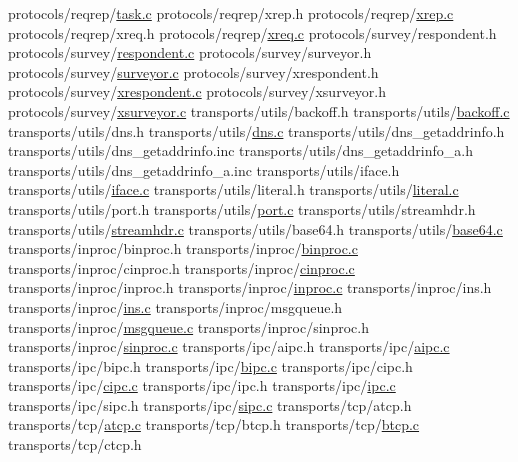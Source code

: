 \begin{DoxyCompactItemize}
protocols/reqrep/\hyperlink{all__1_8js_a7d4a455e4f44360eeccfbf0c3079fc32}{task.\+c} protocols/reqrep/xrep.\+h protocols/reqrep/\hyperlink{all__1_8js_a7d4a455e4f44360eeccfbf0c3079fc32}{xrep.\+c} protocols/reqrep/xreq.\+h protocols/reqrep/\hyperlink{all__1_8js_a7d4a455e4f44360eeccfbf0c3079fc32}{xreq.\+c} protocols/survey/respondent.\+h protocols/survey/\hyperlink{all__1_8js_a7d4a455e4f44360eeccfbf0c3079fc32}{respondent.\+c} protocols/survey/surveyor.\+h protocols/survey/\hyperlink{all__1_8js_a7d4a455e4f44360eeccfbf0c3079fc32}{surveyor.\+c} protocols/survey/xrespondent.\+h protocols/survey/\hyperlink{all__1_8js_a7d4a455e4f44360eeccfbf0c3079fc32}{xrespondent.\+c} protocols/survey/xsurveyor.\+h protocols/survey/\hyperlink{all__1_8js_a7d4a455e4f44360eeccfbf0c3079fc32}{xsurveyor.\+c} transports/utils/backoff.\+h transports/utils/\hyperlink{all__1_8js_a7d4a455e4f44360eeccfbf0c3079fc32}{backoff.\+c} transports/utils/dns.\+h transports/utils/\hyperlink{all__1_8js_a7d4a455e4f44360eeccfbf0c3079fc32}{dns.\+c} transports/utils/dns\+\_\+getaddrinfo.\+h transports/utils/dns\+\_\+getaddrinfo.\+inc transports/utils/dns\+\_\+getaddrinfo\+\_\+a.\+h transports/utils/dns\+\_\+getaddrinfo\+\_\+a.\+inc transports/utils/iface.\+h transports/utils/\hyperlink{all__1_8js_a7d4a455e4f44360eeccfbf0c3079fc32}{iface.\+c} transports/utils/literal.\+h transports/utils/\hyperlink{all__1_8js_a7d4a455e4f44360eeccfbf0c3079fc32}{literal.\+c} transports/utils/port.\+h transports/utils/\hyperlink{all__1_8js_a7d4a455e4f44360eeccfbf0c3079fc32}{port.\+c} transports/utils/streamhdr.\+h transports/utils/\hyperlink{all__1_8js_a7d4a455e4f44360eeccfbf0c3079fc32}{streamhdr.\+c} transports/utils/base64.\+h transports/utils/\hyperlink{all__1_8js_a7d4a455e4f44360eeccfbf0c3079fc32}{base64.\+c} transports/inproc/binproc.\+h transports/inproc/\hyperlink{all__1_8js_a7d4a455e4f44360eeccfbf0c3079fc32}{binproc.\+c} transports/inproc/cinproc.\+h transports/inproc/\hyperlink{all__1_8js_a7d4a455e4f44360eeccfbf0c3079fc32}{cinproc.\+c} transports/inproc/inproc.\+h transports/inproc/\hyperlink{all__1_8js_a7d4a455e4f44360eeccfbf0c3079fc32}{inproc.\+c} transports/inproc/ins.\+h transports/inproc/\hyperlink{all__1_8js_a7d4a455e4f44360eeccfbf0c3079fc32}{ins.\+c} transports/inproc/msgqueue.\+h transports/inproc/\hyperlink{all__1_8js_a7d4a455e4f44360eeccfbf0c3079fc32}{msgqueue.\+c} transports/inproc/sinproc.\+h transports/inproc/\hyperlink{all__1_8js_a7d4a455e4f44360eeccfbf0c3079fc32}{sinproc.\+c} transports/ipc/aipc.\+h transports/ipc/\hyperlink{all__1_8js_a7d4a455e4f44360eeccfbf0c3079fc32}{aipc.\+c} transports/ipc/bipc.\+h transports/ipc/\hyperlink{all__1_8js_a7d4a455e4f44360eeccfbf0c3079fc32}{bipc.\+c} transports/ipc/cipc.\+h transports/ipc/\hyperlink{all__1_8js_a7d4a455e4f44360eeccfbf0c3079fc32}{cipc.\+c} transports/ipc/ipc.\+h transports/ipc/\hyperlink{all__1_8js_a7d4a455e4f44360eeccfbf0c3079fc32}{ipc.\+c} transports/ipc/sipc.\+h transports/ipc/\hyperlink{all__1_8js_a7d4a455e4f44360eeccfbf0c3079fc32}{sipc.\+c} transports/tcp/atcp.\+h transports/tcp/\hyperlink{all__1_8js_a7d4a455e4f44360eeccfbf0c3079fc32}{atcp.\+c} transports/tcp/btcp.\+h transports/tcp/\hyperlink{all__1_8js_a7d4a455e4f44360eeccfbf0c3079fc32}{btcp.\+c} transports/tcp/ctcp.\+h 
\end{DoxyCompactItemize}
